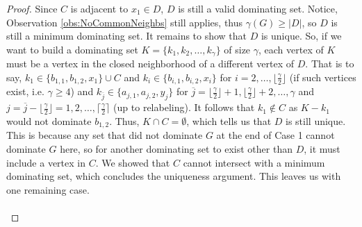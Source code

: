 \documentclass[12pt]{amsart}
\newcommand{\floor}[1]{\lfloor{#1}\rfloor}
\newcommand{\ceil}[1]{\lceil{#1}\rceil}
\newtheorem{obs}[thm]{Observation}
\begin{document}
\begin{proof}




Since $C$ is adjacent to $x_1 \in D$, $D$ is still a valid dominating set. Notice, Observation \ref{obs:NoCommonNeighbs} still applies, thus $\gamma(G) \geq |D|$, so $D$ is still a minimum dominating set. It remains to show that $D$ is unique. So, if we want to build a dominating set $K = \{k_1,k_2,\ldots,k_\gamma\}$ of size $\gamma$, each vertex of $K$ must be a vertex in the closed neighborhood of a different vertex of $D$. That is to say, $k_1 \in  \{b_{1,1},b_{1,2},x_1\} \cup C$ and $k_i \in \{b_{i,1},b_{i,2},x_i\}$ for $i = 2,\ldots,\floor{\frac{\gamma}{2}}$ (if such vertices exist, i.e. $\gamma \geq 4$) and $k_{\overline{j}} \in \{a_{j,1},a_{j,2},y_j\}$ for $\overline{j} = \floor{\frac{\gamma}{2}} + 1 ,\floor{\frac{\gamma}{2}} + 2, \ldots, \gamma$ and $j = \overline{j} - \floor{\frac{\gamma}{2}} = 1,2,\ldots,\ceil{\frac{\gamma}{2}}$ (up to relabeling). It follows that $k_1 \notin C$ as $K - k_1$ would not dominate $b_{1,2}$. Thus, $K \cap C = \emptyset$, which tells us that $D$ is still unique. This is because any set that did not dominate $G$ at the end of Case 1 cannot dominate $G$ here, so for another dominating set to exist other than $D$, it must include a vertex in $C$. We showed that $C$ cannot intersect with a minimum dominating set, which concludes the uniqueness argument. This leaves us with one remaining case.\\\\

\end{proof}
\end{document}
